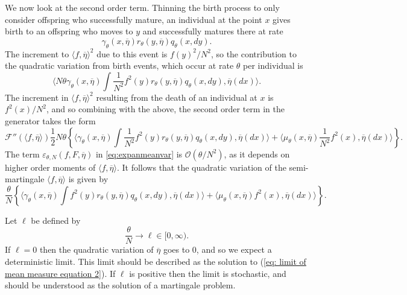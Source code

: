 \documentclass[12pt]{article}
\begin{document}
We now look at the second order term.
Thinning the birth process to only consider offspring
who successfully mature,
an individual at the point $x$ gives birth to an offspring
who moves to $y$ and successfully matures there
at rate
$$
    \gamma_\theta(x,\overline{\eta}) r_{\theta}(y,\overline{\eta}) q_{\theta}(x, dy) .
$$
The increment to $\langle f, \overline{\eta}\rangle^2$ due to this event is $f(y)^2/N^2$,
so the contribution to the quadratic variation from birth events, which
occur at rate $\theta$ per individual is
$$
    \langle N\theta
        \gamma_\theta(x,\overline{\eta})
        \int
            \frac{1}{N^2} f^2(y) r_{\theta}(y,\overline{\eta})
        q_\theta(x,dy)
        ,
        \overline{\eta}(dx)
    \rangle .
$$
The increment in $\langle f, \overline{\eta}\rangle^2$ resulting from 
the death of an individual at $x$ is $f^2(x)/N^2$, and so combining with the 
above, the second order term in the generator takes the form
$$
    \mathcal{F}''(\langle f, \overline{\eta}\rangle)
    \frac{1}{2}N\theta \left\{
        \langle
            \gamma_\theta(x,\overline{\eta})
            \int \frac{1}{N^2} f^2(y) r_\theta(y,\overline{\eta}) q_\theta(x,dy) 
            ,
            \overline{\eta}(dx)
        \rangle
        +
        \langle
            \mu_\theta(x,\overline{\eta})\frac{1}{N^2}f^2(x) 
            ,
            \overline{\eta}(dx)
        \rangle
    \right\} .
$$
The term $\varepsilon_{\theta,N}(f, F, \overline{\eta})$ in \eqref{eq:expanmeanvar}
is ${\mathcal O}(\theta/N^2)$,
as it depends on higher order moments of $\langle f ,\overline{\eta} \rangle$.
It follows that the quadratic variation of the semi-martingale $\langle f, \overline{\eta} \rangle$
is given by
\begin{equation} \label{quadratic variation}
    \frac{\theta}{N}
    \left\{
        \langle
            \gamma_\theta(x,\overline{\eta})
            \int f^2(y)r_\theta(y,\overline{\eta})q_\theta(x,dy) 
            ,
            \overline{\eta}(dx)
        \rangle
        +
        \langle
            \mu_\theta(x,\overline{\eta})f^2(x) 
            ,
            \overline{\eta}(dx)
        \rangle
    \right\} .
\end{equation}

Let $\ell$ be defined by
\begin{equation}
 \frac{\theta}{N} \rightarrow \ell \in [0,\infty).
 \label{defn:rho}
 \end{equation}
If $\ell=0$ then the quadratic variation of $\overline{\eta}$ goes to $0$, and so we expect a deterministic limit. This limit should be described as the solution to (\ref{eq: limit of mean measure equation 2}). If $\ell$ is positive then the limit is stochastic, and should be understood as the solution of a martingale problem. 
\end{document}
